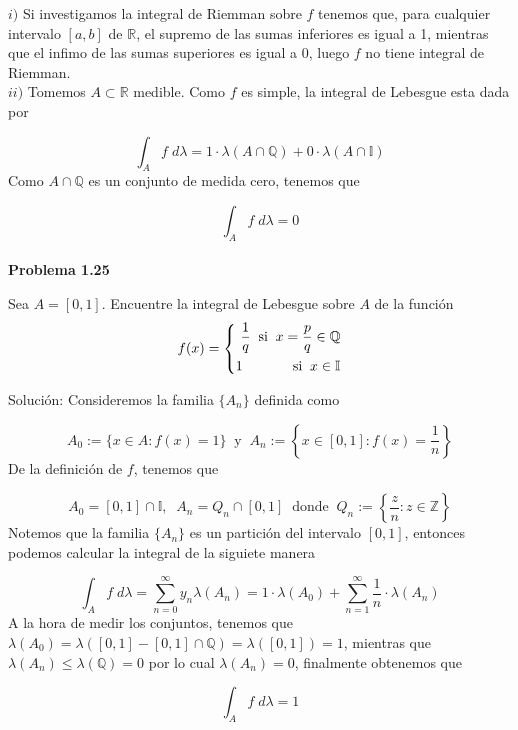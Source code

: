 \documentclass[12pt]{article}
\begin{document}
    $i)$ Si investigamos la integral de Riemman sobre $f$ tenemos que, para cualquier 
    intervalo $[a,b]$ de $\mathbb{R}$, el supremo de las sumas inferiores es igual a 1, 
    mientras que el infimo de las sumas superiores es igual a 0, luego $f$ no tiene
    integral de Riemman.
    \\

    $ii)$ Tomemos $A\subset \mathbb{R}$ medible. Como $f$ es simple, la integral de Lebesgue
    esta dada por 

    \[\int_A f\; d\lambda = 1\cdot \lambda(A\cap \mathbb{Q})+0\cdot \lambda(A\cap \mathbb{I})\]
    Como $A\cap \mathbb{Q}$ es un conjunto de medida cero, tenemos que 

    \[\int_A f\; d\lambda = 0\]
    \\

    \textbf{Problema 1.25}

    Sea $A = [0,1]$. Encuentre la integral de Lebesgue sobre $A$ de la funci\'on
    \begin{equation*}
        f(x) = \left\{
        \begin{aligned}
            \frac{1}{q}\;\; \text{si}\;\; x = \frac{p}{q}\in \mathbb{Q} \\
            1\hspace*{36pt} \text{si}\;\; x\in \mathbb{I}
        \end{aligned}
        \right.
    \end{equation*}

    Soluci\'on: Consideremos la familia $\{A_n\}$ definida como

    \[A_0 := \{x\in A : f(x) = 1\}\;\; \text{y}\;\; A_n := \left\{x\in [0,1] : f(x) = \frac{1}{n}\right\}\]
    De la definici\'on de $f$, tenemos que 

    \[A_0 = [0,1]\cap \mathbb{I},\;\; A_n = Q_n\cap[0,1]\;\; \text{donde}\;\; Q_n := \left\{\frac{z}{n} : z\in \mathbb{Z}\right\}\]
    Notemos que la familia $\{A_n\}$ es un partici\'on del intervalo $[0,1]$, entonces podemos
    calcular la integral de la siguiete manera

    \[\int_A f\; d\lambda = \sum_{n=0}^{\infty} y_n\lambda(A_n) = 1\cdot\lambda(A_0)+\sum_{n=1}^{\infty} \frac{1}{n}\cdot\lambda(A_n)\]
    A la hora de medir los conjuntos, tenemos que 
    $\lambda(A_0) = \lambda([0,1]-[0,1]\cap\mathbb{Q}) = \lambda([0,1]) = 1$, mientras que
    $\lambda(A_n) \leq \lambda(\mathbb{Q}) = 0$ por lo cual $\lambda(A_n) = 0$, finalmente 
    obtenemos que 

    \[\int_A f\; d\lambda = 1\]
    \newpage
\end{document}

